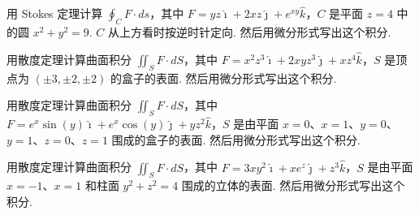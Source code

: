 \begin{question}\label{q:9-26}
用 Stokes 定理计算 $\oint_C F\cdot ds$，其中 $F=yz\hat{\imath}+2xz\hat{\jmath}+e^{xy}\hat{k}$，$C$ 是平面 $z=4$ 中的圆 $x^2+y^2=9$. $C$ 从上方看时按逆时针定向. 然后用微分形式写出这个积分.
\end{question}

\begin{question}\label{q:9-27}
用散度定理计算曲面积分 $\iint_S F\cdot dS$，其中 $F=x^2z^3\hat{\imath}+2xyz^3\hat{\jmath}+xz^4\hat{k}$，$S$ 是顶点为 $(\pm3,\pm2,\pm2)$ 的盒子的表面. 然后用微分形式写出这个积分.
\end{question}

\begin{question}\label{q:9-28}
用散度定理计算曲面积分 $\iint_S F\cdot dS$，其中 $F=e^x\sin(y)\hat{\imath}+e^x\cos(y)\hat{\jmath}+yz^2\hat{k}$，$S$ 是由平面 $x=0$、$x=1$、$y=0$、$y=1$、$z=0$、$z=1$ 围成的盒子的表面. 然后用微分形式写出这个积分.
\end{question}

\begin{question}\label{q:9-29}
用散度定理计算曲面积分 $\iint_S F\cdot dS$，其中 $F=3xy^2\hat{\imath}+xe^z\hat{\jmath}+z^3\hat{k}$，$S$ 是由平面 $x=-1$、$x=1$ 和柱面 $y^2+z^2=4$ 围成的立体的表面. 然后用微分形式写出这个积分.
\end{question}

